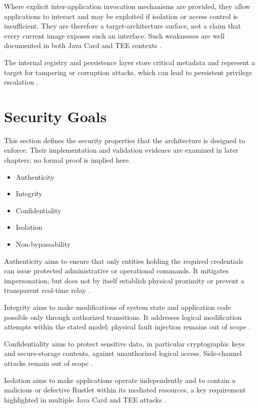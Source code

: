 Where explicit inter-application invocation mechanisms are provided, they allow
applications to interact and may be exploited if isolation or access control is
insufficient. They are therefore a target-architecture surface, not a claim
that every current image exposes such an interface. Such weaknesses are well
documented in both Java Card and TEE contexts
\cite{mostowski2008malicious, cerdeira2022rezone}.

The internal registry and persistence layer store critical metadata and
represent a target for tampering or corruption attacks, which can lead to
persistent privilege escalation \cite{munoz2023tee}.

\section{Security Goals}

This section defines the security properties that the architecture is designed
to enforce. Their implementation and validation evidence are examined in later
chapters; no formal proof is implied here.

\begin{itemize}
\item Authenticity
\item Integrity
\item Confidentiality
\item Isolation
\item Non-bypassability
\end{itemize}

Authenticity aims to ensure that only entities holding the required credentials
can issue protected administrative or operational commands. It mitigates
impersonation, but does not by itself establish physical proximity or prevent a
transparent real-time relay \cite{roland2012relay}.

Integrity aims to make modifications of system state and application code
possible only through authorized transitions. It addresses logical
modification attempts within the stated model; physical fault injection remains
out of scope \cite{boneh1997faults}.

Confidentiality aims to protect sensitive data, in particular cryptographic
keys and secure-storage contents, against unauthorized logical access.
Side-channel attacks remain out of scope \cite{kocher1999dpa}.

Isolation aims to make applications operate independently and to contain a
malicious or defective Rustlet within its mediated resources, a key requirement
highlighted in multiple Java Card and TEE attacks
\cite{mostowski2008malicious}.

